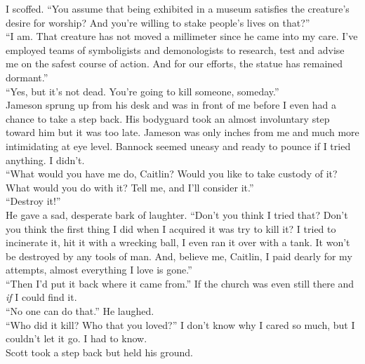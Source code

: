 \documentclass[a5paper]{scrartcl}
\begin{document}
I scoffed. \enquote{You assume that being exhibited in a museum satisfies the creature's desire for worship? And you're willing to stake people's lives on that?}\\


\enquote{I am. That creature has not moved a millimeter since he came into my care. I've employed teams of symboligists and demonologists to research, test and advise me on the safest course of action. And for our efforts, the statue has remained dormant.}\\


\enquote{Yes, but it's not dead. You're going to kill someone, someday.}\\


Jameson sprung up from his desk and was in front of me before I even had a chance to take a step back. His bodyguard took an almost involuntary step toward him but it was too late. Jameson was only inches from me and much more intimidating at eye level. Bannock seemed uneasy and ready to pounce if I tried anything. I didn't.\\


\enquote{What would you have me do, Caitlin? Would you like to take custody of it? What would you do with it? Tell me, and I'll consider it.}\\


\enquote{Destroy it!} \\


He gave a sad, desperate bark of laughter. \enquote{Don't you think I tried that? Don't you think the first thing I did when I acquired it was try to kill it? I tried to incinerate it, hit it with a wrecking ball, I even ran it over with a tank. It won't be destroyed by any tools of man. And, believe me, Caitlin, I paid dearly for my attempts,  almost everything I love is gone.}\\


\enquote{Then I'd put it back where it came from.} If the church was even still there and \textit{if}
 I could find it.\\


\enquote{No one can do that.} He laughed.\\


\enquote{Who did it kill? Who that you loved?} I don't know why I cared so much, but I couldn't let it go. I had to know.\\


Scott took a step back but held his ground. \\
\end{document}
